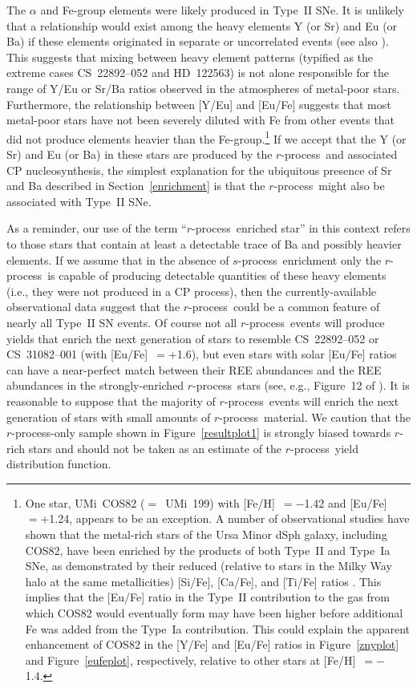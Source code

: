 \documentclass{emulateapj}
\def\rpro{\mbox{$r$-process}}
\def\spro{\mbox{$s$-process}}
\begin{document}
The $\alpha$ and Fe-group elements were likely 
produced in Type~II SNe.
It is unlikely that a relationship would exist among the
heavy elements Y (or Sr) and Eu (or Ba) if these elements originated in 
separate or uncorrelated events (see also \citealt{johnson02b}).
This suggests that mixing between heavy element patterns 
(typified as the extreme cases 
\mbox{CS~22892--052} and \mbox{HD~122563}) 
is not alone responsible
for the range of Y/Eu or Sr/Ba ratios observed in the atmospheres
of metal-poor stars.
Furthermore, the relationship between [Y/Eu] and [Eu/Fe] suggests that most
metal-poor stars have not been severely diluted with Fe from other events
that did not produce elements heavier than the Fe-group.\footnote{
One star, UMi~COS82 ($=$~UMi~199) 
with [Fe/H]~$= -$1.42 and [Eu/Fe]~$= +$1.24,
appears to be an exception.
A number of observational studies have shown that 
the metal-rich stars of the Ursa Minor dSph
galaxy, including COS82,
have been enriched by the products of both Type~II and Type~Ia
SNe, as demonstrated by their reduced (relative to stars in the
Milky Way halo at the same metallicities) [Si/Fe], [Ca/Fe], and [Ti/Fe]
ratios \citep{shetrone01,sadakane04,cohen10}.
This implies that the [Eu/Fe] ratio in the Type~II contribution
to the gas from which COS82 would eventually form may have
been higher before additional Fe was added from the Type~Ia contribution.
This could explain the apparent enhancement of COS82 in the [Y/Fe] 
and [Eu/Fe] ratios in Figure~\ref{znyplot} and Figure~\ref{eufeplot}, 
respectively, relative to other stars at [Fe/H]~$= -$1.4.}
If we accept that the Y (or Sr) and Eu (or Ba) 
in these stars are produced by the \rpro\
and associated CP nucleosynthesis,
the simplest explanation for the ubiquitous presence 
of Sr and Ba described in Section~\ref{enrichment} 
is that the \rpro\ might also be associated with Type~II SNe. 

As a reminder, our use of the term ``\rpro\ enriched star''
in this context refers to those stars that contain at least 
a detectable trace of Ba and possibly heavier elements.
If we assume that in the absence of \spro\ enrichment only
the \rpro\ is capable of producing detectable quantities 
of these heavy elements (i.e., they were not produced in a
CP process), then the currently-available
observational data suggest that the \rpro\ could be a common feature of
nearly all Type~II SN events.
Of course not all \rpro\ events will produce yields that
enrich the next generation of stars to resemble
\mbox{CS~22892--052} or \mbox{CS~31082--001} 
(with [Eu/Fe]~$= +$1.6), but
even stars with solar [Eu/Fe] ratios can have a near-perfect
match between their REE abundances and the REE abundances
in the strongly-enriched \rpro\ stars 
(see, e.g., Figure~12 of \citealt{roederer10a}).
It is reasonable to suppose that the majority of \rpro\ events will
enrich the next generation of stars with small amounts of
\rpro\ material. %
We caution that
the \rpro-only sample shown in Figure~\ref{resultplot1} is strongly
biased towards $r$-rich stars and should not be taken as an
estimate of the \rpro\ yield distribution function.
\end{document}
